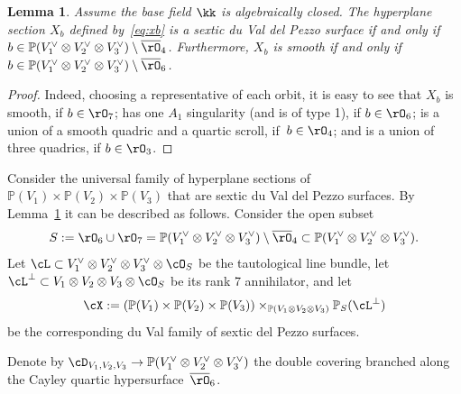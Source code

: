 \documentclass[11pt]{amsart}
\renewcommand{\P}{{\mathbb{P}}}
\theoremstyle{plain}
\newtheorem{lemma}[theorem]{Lemma}
\theoremstyle{definition}
\theoremstyle{remark}
\begin{document}
\begin{lemma}\label{lemma:xb-duval}
Assume the base field $\kk$ is algebraically closed.
The hyperplane section $X_b$ defined by~\textup{\eqref{eq:xb}} is a sextic du Val del Pezzo surface if and only if $b \in \P(V_1^\vee \otimes V_2^\vee \otimes V_3^\vee) \setminus \overline\rO_4$.
Furthermore, $X_b$ is smooth if and only if $b \in \P(V_1^\vee \otimes V_2^\vee \otimes V_3^\vee) \setminus \overline\rO_6$.
\end{lemma}
\begin{proof}
Indeed, choosing a representative of each orbit, it is easy to see that 
$X_b$ is smooth, if $b \in \rO_7$; 
has one $A_1$ singularity (and is of type 1), if $b \in \rO_6$;
is a union of a smooth quadric and a quartic scroll, if~$b \in \rO_4$; 
and is a union of three quadrics, if $b \in \rO_3$.
\end{proof}

Consider the universal family of hyperplane sections of $\P(V_1) \times \P(V_2) \times \P(V_3)$ that are sextic du Val del Pezzo surfaces.
By Lemma~\ref{lemma:xb-duval} it can be described as follows.
Consider the open subset 
\begin{equation*}
S := \rO_6 \cup \rO_7 = \P(V_1^\vee \otimes V_2^\vee \otimes V_3^\vee) \setminus \overline\rO_4 \subset \P(V_1^\vee \otimes V_2^\vee \otimes V_3^\vee).
\end{equation*}
Let $\cL \subset V_1^\vee \otimes V_2^\vee \otimes V_3^\vee \otimes \cO_S$ be the tautological line bundle, let $\cL^\perp \subset V_1 \otimes V_2 \otimes V_3 \otimes \cO_S$ be its rank 7 annihilator, and let 
\begin{equation}\label{eq:cx-p1p1p1}
\cX := (\P(V_1) \times \P(V_2) \times \P(V_3)) \times_{\P(V_1 \otimes V_2 \otimes V_3)} \P_S(\cL^\perp)
\end{equation}
be the corresponding du Val family of sextic del Pezzo surfaces.


Denote by ${\cD_{V_1,V_2,V_3}} \to \P(V_1^\vee \otimes V_2^\vee \otimes V_3^\vee)$ the double covering branched along the Cayley quartic hypersurface~$\overline\rO_6$.
\end{document}
